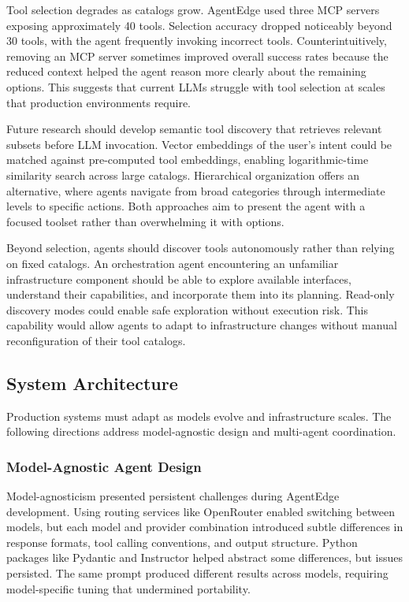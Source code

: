 Tool selection degrades as catalogs grow. \ac{AgentEdge} used three \ac{MCP} servers exposing approximately 40 tools. Selection accuracy dropped noticeably beyond 30 tools, with the agent frequently invoking incorrect tools. Counterintuitively, removing an \ac{MCP} server sometimes improved overall success rates because the reduced context helped the agent reason more clearly about the remaining options. This suggests that current \acp{LLM} struggle with tool selection at scales that production environments require.

Future research should develop semantic tool discovery that retrieves relevant subsets before \ac{LLM} invocation. Vector embeddings of the user's intent could be matched against pre-computed tool embeddings, enabling logarithmic-time similarity search across large catalogs. Hierarchical organization offers an alternative, where agents navigate from broad categories through intermediate levels to specific actions. Both approaches aim to present the agent with a focused toolset rather than overwhelming it with options.

Beyond selection, agents should discover tools autonomously rather than relying on fixed catalogs. An orchestration agent encountering an unfamiliar infrastructure component should be able to explore available interfaces, understand their capabilities, and incorporate them into its planning. Read-only discovery modes could enable safe exploration without execution risk. This capability would allow agents to adapt to infrastructure changes without manual reconfiguration of their tool catalogs.

\subsection{System Architecture}
\label{subsec:ch6_system_architecture}

Production systems must adapt as models evolve and infrastructure scales. The following directions address model-agnostic design and multi-agent coordination.

\subsubsection{Model-Agnostic Agent Design}
\label{subsubsec:ch6_model_agnostic}

Model-agnosticism presented persistent challenges during \ac{AgentEdge} development. Using routing services like OpenRouter enabled switching between models, but each model and provider combination introduced subtle differences in response formats, tool calling conventions, and output structure. Python packages like Pydantic and Instructor helped abstract some differences, but issues persisted. The same prompt produced different results across models, requiring model-specific tuning that undermined portability.

